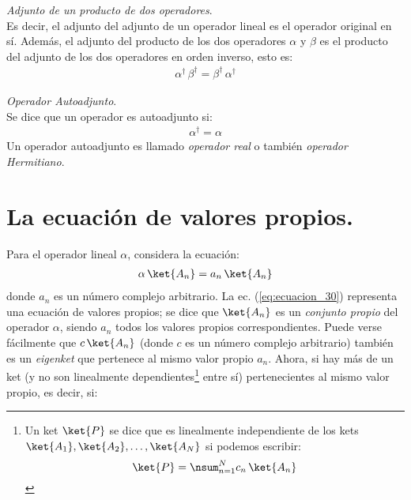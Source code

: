\noindent
\emph{Adjunto de un producto de dos operadores}.
\\[0.5em]
\noindent
Es decir, el adjunto del adjunto de un operador lineal es el operador original en sí. Además, el adjunto del producto de los dos operadores $\alpha$ y $\beta$ es el producto del adjunto de los dos operadores en orden inverso, esto es:
\begin{align}
\alpha^{\dagger} \, \beta^{\dagger} = \beta^{\dagger} \, \alpha^{\dagger}
\label{eq:ecuacion_24}
\end{align}

\noindent
\emph{Operador Autoadjunto}.
\\[0.5em]
\noindent
Se dice que un operador es autoadjunto si:
\begin{align}
\alpha^{\dagger} = \alpha
\label{eq:ecuacion_29}
\end{align}
Un operador autoadjunto es llamado \emph{operador real} o también \emph{operador Hermitiano}.

\section{La ecuación de valores propios.}

Para el operador lineal $\alpha$, considera la ecuación:
\begin{align}
\alpha \, \ket{A_{n}} = a_{n} \, \ket{A_{n}}
\label{eq:ecuacion_30}
\end{align}
donde $a_{n}$ es un número complejo arbitrario. La ec. (\ref{eq:ecuacion_30}) representa una ecuación de valores propios; se dice que $\ket{A_{n}}$ es un \emph{conjunto propio} del operador $\alpha$, siendo $a_{n}$ todos los valores propios correspondientes. Puede verse fácilmente que $c \, \ket{A_{n}}$ (donde $c$ es un número complejo arbitrario) también es un \emph{eigenket} que pertenece al mismo valor propio $a_{n}$. Ahora, si hay más de un ket (y no son linealmente dependientes\footnote{Un ket $\ket{P}$ se dice que es linealmente independiente de los kets $\ket{A_{1}}, \ket{A_{2}}, \ldots, \ket{A_{N}}$ si podemos escribir: \[
\ket{P} = \nsum_{n=1}^{N} c_{n} \, \ket{A_{n}} \]} entre sí) pertenecientes al mismo valor propio, es decir, si:

